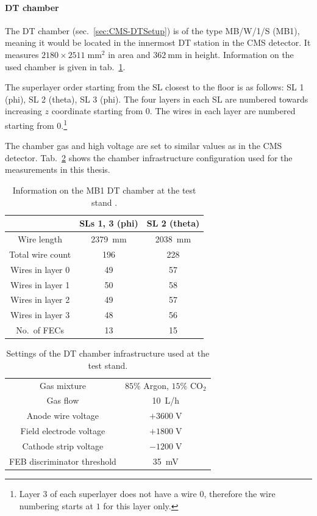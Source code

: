 \paragraph{DT chamber}
The \ac{DT} chamber (sec.\ \ref{sec:CMS-DTSetup}) is of the type MB/W/1/S (MB1), meaning it would be located in the innermost \ac{DT} station in the \ac{CMS} detector. It measures $2180 \times 2511\;\si{\milli\meter^2}$ in area and $\SI{362}{\milli\meter}$ in height. Information on the used chamber is given in tab.\ \ref{tab:MB1Chamber-Cells}.
\par The superlayer order starting from the \ac{SL} closest to the floor is as follows: \ac{SL} 1 (phi), \ac{SL} 2 (theta), \ac{SL} 3 (phi). The four layers in each \ac{SL} are numbered towards increasing $z$ coordinate starting from $0$. The wires in each layer are numbered starting from $0$.\footnote{Layer $3$ of each superlayer does not have a wire $0$, therefore the wire numbering starts at $1$ for this layer only.}
\par The chamber gas and high voltage are set to similar values as in the \ac{CMS} detector. Tab.\ \ref{tab:MB1Chamber-Settings} shows the chamber infrastructure configuration used for the measurements in this thesis.
\begin{table}[htb]
\centering
\begin{tabular}{|c|c|c|}
\hline
& \acp{SL} 1, 3 (phi) & \ac{SL} 2 (theta) \\ \hline
Wire length & \SI{2379}{\milli\meter} & \SI{2038}{\milli\meter} \\
Total wire count & 196 & 228 \\
Wires in layer 0 & 49 & 57 \\
Wires in layer 1 & 50 & 58 \\
Wires in layer 2 & 49 & 57 \\
Wires in layer 3 & 48 & 56 \\
No.\ of \acp{FEC} & 13 & 15 \\ \hline
\end{tabular}
\caption{Information on the MB1 \ac{DT} chamber at the test stand \cite{CMS-Main}.}
\label{tab:MB1Chamber-Cells}
\end{table}
\begin{table}[htb]
\centering
\begin{tabular}{|c|c|}
\hline
Gas mixture & $85\%$ Argon, $15\%$ CO$_2$ \\
Gas flow & \SI{10}{\liter/\hour} \\ \hline
Anode wire voltage & $+3600\;\si{\volt}$ \\
Field electrode voltage & $+1800\;\si{\volt}$ \\
Cathode strip voltage & $-1200\;\si{\volt}$ \\ \hline
\ac{FEB} discriminator threshold & \SI{35}{\milli\volt} \\ \hline
\end{tabular}
\caption{Settings of the \ac{DT} chamber infrastructure used at the test stand.}
\label{tab:MB1Chamber-Settings}
\end{table}
\FloatBarrier
